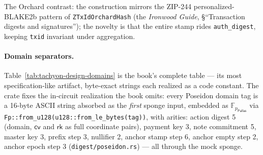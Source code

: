 \documentclass[11pt,a4paper]{article}
\theoremstyle{definition}
\newcommand{\F}{\mathbb{F}}
\newcommand{\cvsym}{\mathsf{cv}}
\newcommand{\rk}{\mathsf{rk}}
\newcommand{\Pallas}{\ensuremath{\mathsf{Pallas}}}
\begin{document}
The Orchard contrast: the construction mirrors the ZIP-244
personalized-BLAKE2b pattern of \texttt{ZTxIdOrchardHash} (the
\emph{Ironwood Guide}, \S``Transaction digests and signatures'');
the
novelty is that the entire stamp rides \texttt{auth\_digest}, keeping
\texttt{txid} invariant under aggregation.

\paragraph{Domain separators.} Table~\ref{tab:tachyon-design-domains} is
the book's complete table --- its most specification-like artifact,
byte-exact strings each realized as a code constant. The crate fixes the
in-circuit realization the book omits: every Poseidon domain tag is a
16-byte ASCII string absorbed as the \emph{first} sponge input, embedded
as $\F_{p_{\Pallas}}$ via
\texttt{Fp::from\_u128(u128::from\_le\_bytes(tag))}, with arities: action
digest 5 (domain, $\cvsym$ and $\rk$ as full coordinate pairs), payment
key 3, note commitment 5, master key 3, prefix step 3, nullifier 2, anchor
stamp step 6, anchor empty step 2, anchor epoch step 3
(\texttt{digest/poseidon.rs}) --- all through the mock sponge.
\end{document}
